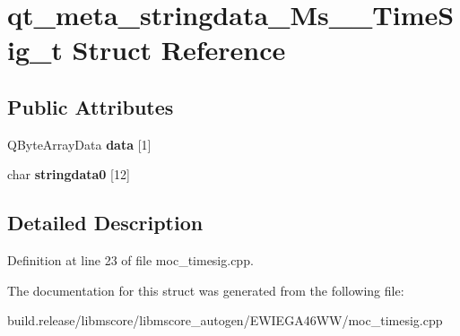 \hypertarget{structqt__meta__stringdata___ms_____time_sig__t}{}\section{qt\+\_\+meta\+\_\+stringdata\+\_\+\+Ms\+\_\+\+\_\+\+Time\+Sig\+\_\+t Struct Reference}
\label{structqt__meta__stringdata___ms_____time_sig__t}
\subsection*{Public Attributes}
\begin{DoxyCompactItemize}
\item 
\mbox{\label{structqt__meta__stringdata___ms_____time_sig__t_aca19725717b4c7cfe2e8d84b19867d2e}} 
Q\+Byte\+Array\+Data {\bfseries data} \mbox{[}1\mbox{]}
\item 
\mbox{\label{structqt__meta__stringdata___ms_____time_sig__t_a0c67a3db2ba67339660d6bbc89eb2534}} 
char {\bfseries stringdata0} \mbox{[}12\mbox{]}
\end{DoxyCompactItemize}


\subsection{Detailed Description}


Definition at line 23 of file moc\+\_\+timesig.\+cpp.



The documentation for this struct was generated from the following file\+:\begin{DoxyCompactItemize}
\item 
build.\+release/libmscore/libmscore\+\_\+autogen/\+E\+W\+I\+E\+G\+A46\+W\+W/moc\+\_\+timesig.\+cpp\end{DoxyCompactItemize}
